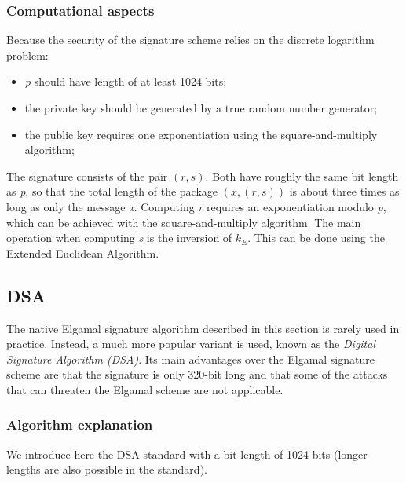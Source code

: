 \subsubsection{Computational aspects}
Because the security of the signature scheme relies on the discrete logarithm problem:
\begin{itemize}
    \item \textit{p} should have length of at least 1024 bits;
    \item the private key should be generated by a true random number generator;
    \item the public key requires one exponentiation using the square-and-multiply algorithm;
\end{itemize}
The signature consists of the pair $(r,s)$. Both have roughly the same bit length as \textit{p}, so that the total length of the package $(x,(r,s))$ is about three times as long as only the message \textit{x}. Computing \textit{r} requires an exponentiation modulo \textit{p}, which can be achieved with the square-and-multiply algorithm. The main operation when computing \textit{s} is the inversion of $k_E$. This can be done using the Extended Euclidean Algorithm.

\subsection{DSA}
The native Elgamal signature algorithm described in this section is rarely used in practice. Instead, a much more popular variant is used, known as the \textit{Digital Signature Algorithm (DSA)}. Its main advantages over the Elgamal signature scheme are that the signature is only 320-bit long and that some of the attacks that can threaten the Elgamal scheme are not applicable.

\subsubsection{Algorithm explanation}
We introduce here the DSA standard with a bit length of 1024 bits (longer lengths are also possible in the standard).

